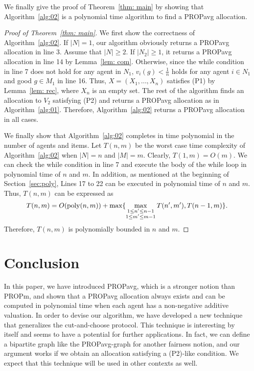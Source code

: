 \documentclass[11pt]{article}
\newcommand{\PROPavg}{\textsf{PROPavg}\xspace}
\newcommand{\PROPm}{\textsf{PROPm}\xspace}
\begin{document}
We finally give the proof of Theorem~\ref{thm: main} by showing that Algorithm~\ref{alg:02} is a polynomial time algorithm to find a \PROPavg allocation.

\begin{proof}[Proof of Theorem~\ref{thm: main}]
We first show the correctness of Algorithm~\ref{alg:02}.
If $|N|=1$, our algorithm obviously returns a \PROPavg allocation in line 3.
Assume that $|N|\ge 2$.
If $|N_2|\ge 1$, it returns a \PROPavg allocation in line 14 by Lemma~\ref{lem: com}.
Otherwise, since the while condition in line 7 does not hold for any agent in $N_1$, $v_i(g)< \frac{1}{n}$ holds for any agent $i\in N_1$ and good $g\in M_1$ in line 16.
Thus, $X=(X_1, \ldots, X_n)$ satisfies (P1) by Lemma~\ref{lem: rec}, where $X_n$ is an empty set.
The rest of the algorithm finds an allocation to $V_2$ satisfying (P2) and returns a \PROPavg allocation as in Algorithm~\ref{alg:01}.
Therefore, Algorithm~\ref{alg:02} returns a \PROPavg allocation in all cases.

We finally show that Algorithm~\ref{alg:02} completes in time polynomial in the number of agents and items.
Let $T(n,m)$ be the worst case time complexity of Algorithm~\ref{alg:02} when $|N|=n$ and $|M|=m$.
Clearly, $T(1,m)=O(m)$.
We can check the while condition in line 7 and execute the body of the while loop in polynomial time of $n$ and $m$.
In addition, as mentioned at the beginning of Section~\ref{sec:poly}, 
Lines 17 to 22 can be executed in polynomial time of $n$ and $m$.
Thus, $T(n,m)$ can be expressed as
$$T(n,m)=O({\rm poly}(n,m))+\max\{\max_{\substack{1\le n' \le n-1\\ 1\le m' \le m-1}}T(n',m'), T(n-1, m)\}.$$
Therefore, $T(n,m)$ is polynomially bounded in $n$ and $m$.
\end{proof}

\section{Conclusion}\label{sec: discussion}
In this paper, we have introduced \PROPavg, which is a stronger notion than
\PROPm, and shown that a \PROPavg allocation always exists and can be computed in polynomial time when each agent has a non-negative additive valuation.
In order to devise our algorithm, we have developed a new technique that
generalizes the cut-and-choose protocol.
This technique is interesting by itself and seems to have a potential for
further applications.
In fact, we can define a bipartite graph like the \PROPavg-graph for
another fairness notion, and our argument works if we obtain an allocation
satisfying a (P2)-like condition.
We expect that this technique will be used in other contexts as well.
\end{document}
